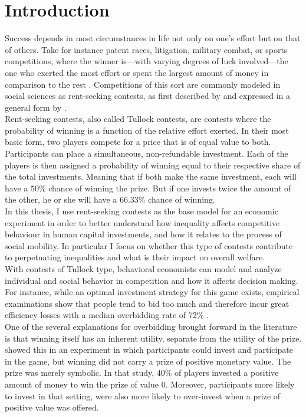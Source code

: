 \chapter{Introduction}
\thispagestyle{fancy}
\label{ch:intro}


Success depends in most circumstances in life not only on one's effort but on that of others. Take for instance patent races, litigation, military combat, or sports competitions, where the winner is---with varying degrees of luck involved---the one who exerted the most effort or spent the largest amount of money in comparison to the rest \citep{konrad2009}. Competitions of this sort are commonly modeled in social sciences as rent-seeking contests, as first described by \cite{tullock1980}  and expressed in a general form by \cite{sheremeta2010a}. \\

Rent-seeking contests, also called Tullock contests, are contests where the probability of winning is a function of the relative effort exerted. In their most basic form, two players compete for a price that is of equal value to both. Participants can place a simultaneous, non-refundable investment. Each of the players is then assigned a probability of winning equal to their respective share of the total investments. Meaning that if both make the same investment, each will have a 50\% chance of winning the prize. But if one invests twice the amount of the other, he or she will have a 66.33\% chance of winning.\\ 

In this thesis, I use rent-seeking contests as the base model for an economic experiment in order to better understand how inequality affects competitive behaviour in human capital investments, and how it relates to the process of social mobility. In particular I focus on whether this type of contests contribute to perpetuating inequalities and what is their impact on overall welfare.\\

With contests of Tullock type, behavioral economists can model and analyze individual and social behavior in competition and how it affects decision making. For instance, while an optimal investment strategy for this game exists, empirical examinations show that people tend to bid too much and therefore incur great efficiency losses with a median overbidding rate of 72\% \citep{sheremeta2013, chowdhury2014, konrad2009, dechenaux2015}.\\

One of the several explanations for overbidding brought forward in the literature is that winning itself has an inherent utility, separate from the utility of the prize. \cite{sheremeta2010} showed this in an experiment in which participants could invest and participate in the game, but winning did not carry a prize of positive monetary value. The prize was merely symbolic. In that study, 40\% of players invested a positive amount of money to win the prize of value 0. Moreover, participants more likely to invest in that setting, were also more likely to over-invest when a prize of positive value was offered.\\

